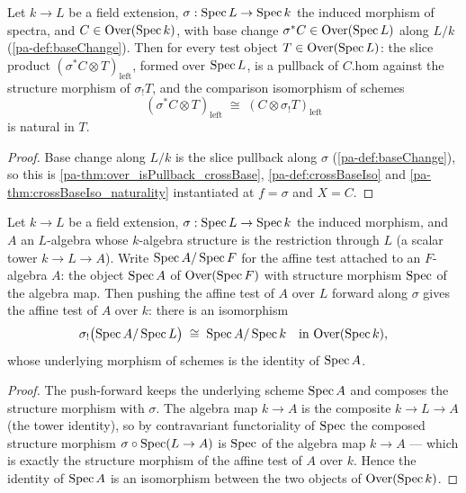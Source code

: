\begin{theorem}
  \label{pa-thm:crossBase_baseChange}
  \leanok

  Let \(k \to L\) be a field extension, \(\sigma : \operatorname{Spec} L \to \operatorname{Spec} k\) the induced
  morphism of spectra, and \(C \in \mathrm{Over}(\operatorname{Spec} k)\), with base change
  \(\sigma^{*}C \in \mathrm{Over}(\operatorname{Spec} L)\) along \(L/k\) (\ref{pa-def:baseChange}). Then for
  every test object \(T \in \mathrm{Over}(\operatorname{Spec} L)\): the slice product
  \((\sigma^{*}C \otimes T)_{\mathrm{left}}\), formed over \(\operatorname{Spec} L\), is a pullback
  of \(C.\mathrm{hom}\) against the structure morphism of \(\sigma_{!}T\), and the
  comparison isomorphism of schemes
  \[
    (\sigma^{*}C \otimes T)_{\mathrm{left}} \;\cong\;
      (C \otimes \sigma_{!}T)_{\mathrm{left}}
  \]
  is natural in \(T\).
\end{theorem}
\begin{proof}
  \leanok
  Base change along \(L/k\) is the slice pullback along \(\sigma\)
  (\ref{pa-def:baseChange}), so this is \ref{pa-thm:over_isPullback_crossBase},
  \ref{pa-def:crossBaseIso} and \ref{pa-thm:crossBaseIso_naturality} instantiated at
  \(f = \sigma\) and \(X = C\).
\end{proof}

\begin{definition}
  \label{pa-def:mapOverSpecIso}
  \leanok

  Let \(k \to L\) be a field extension, \(\sigma : \operatorname{Spec} L \to \operatorname{Spec} k\) the induced
  morphism, and \(A\) an \(L\)-algebra whose \(k\)-algebra structure is the restriction
  through \(L\) (a scalar tower \(k \to L \to A\)). Write \(\operatorname{Spec} A / \operatorname{Spec} F\) for the
  affine test attached to an \(F\)-algebra \(A\): the object \(\operatorname{Spec} A\) of
  \(\mathrm{Over}(\operatorname{Spec} F)\) with structure morphism \(\operatorname{Spec}\) of the algebra map. Then pushing
  the affine test of \(A\) over \(L\) forward along \(\sigma\) gives the affine test of
  \(A\) over \(k\): there is an isomorphism
  \[
    \sigma_{!}\bigl(\operatorname{Spec} A / \operatorname{Spec} L\bigr) \;\cong\; \operatorname{Spec} A / \operatorname{Spec} k
    \quad \text{in } \mathrm{Over}(\operatorname{Spec} k),
  \]
  whose underlying morphism of schemes is the identity of \(\operatorname{Spec} A\).
\end{definition}
\begin{proof}
  \leanok
  The push-forward keeps the underlying scheme \(\operatorname{Spec} A\) and composes the structure
  morphism with \(\sigma\). The algebra map \(k \to A\) is the composite
  \(k \to L \to A\) (the tower identity), so by contravariant functoriality of
  \(\operatorname{Spec}\) the composed structure morphism
  \(\sigma \circ \operatorname{Spec}(L \to A)\) is \(\operatorname{Spec}\) of the algebra map \(k \to A\) --- which
  is exactly the structure morphism of the affine test of \(A\) over \(k\). Hence the
  identity of \(\operatorname{Spec} A\) is an isomorphism between the two objects of
  \(\mathrm{Over}(\operatorname{Spec} k)\).
\end{proof}

